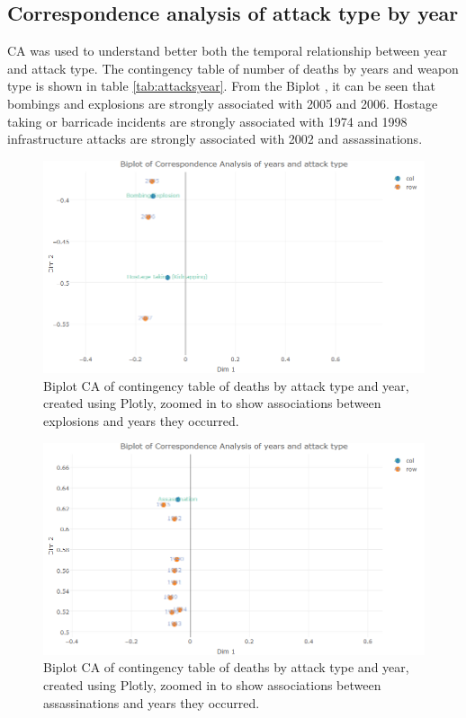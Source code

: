 \subsection{Correspondence analysis of attack type by year}\label{viewing-deaths-by-attack-vector-type-CA}

CA was used to understand better both the temporal relationship between year and attack type. The contingency table of number of deaths by years and weapon type is shown in table \ref{tab:attacksyear}. From the Biplot , it can be seen that bombings and explosions are strongly associated with 2005 and 2006. Hostage taking or barricade incidents are strongly associated with 1974 and 1998 infrastructure attacks are strongly associated with 2002 and assassinations.

\begin{figure}[t]
\includegraphics[width=15cm]{Peters_experiment_markdown_files/figure-latex/biplotexlosions.png}
\caption{Biplot CA of contingency table of deaths by attack type and year, created using Plotly, zoomed in to show associations between explosions  and years they occurred.}
\label{fig:biplotattacktypeca1}
\centering
\end{figure}
\begin{figure}[t]
\includegraphics[width=15cm]{Peters_experiment_markdown_files/figure-latex/assassinationbiplot.png}
\caption{Biplot CA of contingency table of deaths by attack type and year, created using Plotly, zoomed in to show associations between assassinations and years they occurred.}
\label{fig:biplotattacktypeca2}
\centering
\end{figure}

